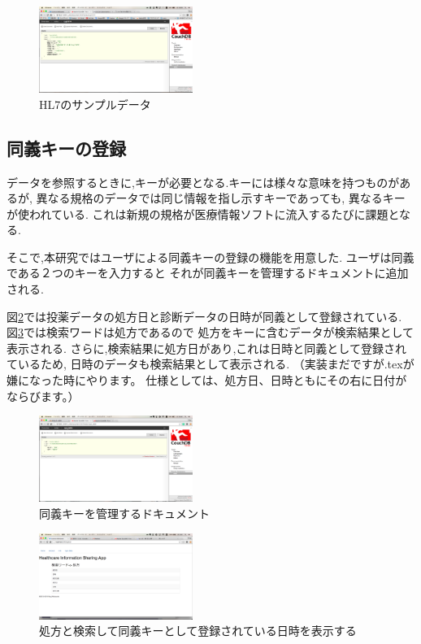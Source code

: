 			\begin{figure}[htbp]
					\includegraphics[width=5cm, bb=0 0 437 688]{./gazou/hl7.png}
				\caption{HL7のサンプルデータ}
				\label{hl7-data}
			\end{figure}



\subsection{同義キーの登録}
	データを参照するときに,キーが必要となる.キーには様々な意味を持つものがあるが,
	異なる規格のデータでは同じ情報を指し示すキーであっても,
	異なるキーが使われている.
	これは新規の規格が医療情報ソフトに流入するたびに課題となる.

	そこで,本研究ではユーザによる同義キーの登録の機能を用意した.
	ユーザは同義である２つのキーを入力すると
	それが同義キーを管理するドキュメントに追加される.

	図\ref{relation}では投薬データの処方日と診断データの日時が同義として登録されている.
	図\ref{relationApp}では検索ワードは処方であるので
	処方をキーに含むデータが検索結果として表示される.
	さらに,検索結果に処方日があり,これは日時と同義として登録されているため,
	日時のデータも検索結果として表示される.
	（実装まだですが.texが嫌になった時にやります。
	仕様としては、処方日、日時ともにその右に日付がならびます。）

	\begin{figure}[htbp]
			\includegraphics[width=5cm, bb=0 0 437 688]{./gazou/relation.png}
		\caption{同義キーを管理するドキュメント}
		\label{relation}
	\end{figure}

	\begin{figure}[htbp]
			\includegraphics[width=5cm, bb=0 0 437 688]{./gazou/relationApp.png}
		\caption{処方と検索して同義キーとして登録されている日時を表示する}
		\label{relationApp}
	\end{figure}
